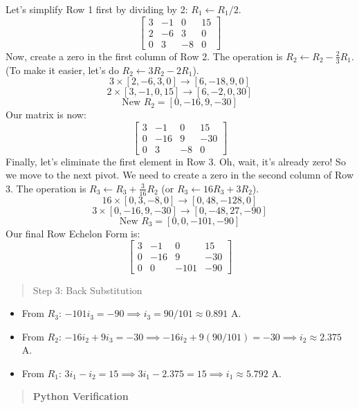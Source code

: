 \documentclass[
  letterpaper,
  DIV=11,
  numbers=noendperiod]{scrreprt}
\begin{document}
Let's simplify Row 1 first by dividing by 2: \(R_1 \leftarrow R_1 / 2\).
\[
\left[
\begin{array}{ccc|c}
3 & -1 & 0 & 15 \\
2 & -6 & 3 & 0 \\
0 & 3 & -8 & 0
\end{array}
\right]
\] Now, create a zero in the first column of Row 2. The operation is
\(R_2 \leftarrow R_2 - \frac{2}{3}R_1\). (To make it easier, let's do
\(R_2 \leftarrow 3R_2 - 2R_1\)). \[
3 \times [2, -6, 3, 0] \rightarrow [6, -18, 9, 0]
\] \[
2 \times [3, -1, 0, 15] \rightarrow [6, -2, 0, 30]
\] \[
\text{New } R_2 = [0, -16, 9, -30]
\] Our matrix is now: \[
\left[
\begin{array}{ccc|c}
3 & -1 & 0 & 15 \\
0 & -16 & 9 & -30 \\
0 & 3 & -8 & 0
\end{array}
\right]
\] Finally, let's eliminate the first element in Row 3. Oh, wait, it's
already zero! So we move to the next pivot. We need to create a zero in
the second column of Row 3. The operation is
\(R_3 \leftarrow R_3 + \frac{3}{16}R_2\) (or
\(R_3 \leftarrow 16R_3 + 3R_2\)). \[
16 \times [0, 3, -8, 0] \rightarrow [0, 48, -128, 0]
\] \[
3 \times [0, -16, 9, -30] \rightarrow [0, -48, 27, -90]
\] \[
\text{New } R_3 = [0, 0, -101, -90]
\] Our final Row Echelon Form is: \[
\left[
\begin{array}{ccc|c}
3 & -1 & 0 & 15 \\
0 & -16 & 9 & -30 \\
0 & 0 & -101 & -90
\end{array}
\right]
\]

\begin{quote}
Step 3: Back Substitution
\end{quote}

\begin{itemize}
\item
  From \(R_3\): \(-101i_3 = -90 \implies i_3 = 90/101 \approx 0.891\) A.
\item
  From \(R_2\):
  \(-16i_2 + 9i_3 = -30 \implies -16i_2 + 9(90/101) = -30 \implies i_2 \approx 2.375\)
  A.
\item
  From \(R_1\):
  \(3i_1 - i_2 = 15 \implies 3i_1 - 2.375 = 15 \implies i_1 \approx 5.792\)
  A.
\end{itemize}

\begin{quote}
\textbf{Python Verification}
\end{quote}
\end{document}

